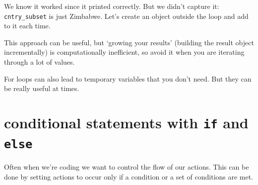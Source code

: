 \documentclass[]{book}
\newenvironment{Shaded}{\begin{snugshade}}{\end{snugshade}}
\newcommand{\KeywordTok}[1]{\textcolor[rgb]{0.13,0.29,0.53}{\textbf{#1}}}
\newcommand{\DataTypeTok}[1]{\textcolor[rgb]{0.13,0.29,0.53}{#1}}
\newcommand{\StringTok}[1]{\textcolor[rgb]{0.31,0.60,0.02}{#1}}
\newcommand{\CommentTok}[1]{\textcolor[rgb]{0.56,0.35,0.01}{\textit{#1}}}
\newcommand{\ControlFlowTok}[1]{\textcolor[rgb]{0.13,0.29,0.53}{\textbf{#1}}}
\newcommand{\OperatorTok}[1]{\textcolor[rgb]{0.81,0.36,0.00}{\textbf{#1}}}
\newcommand{\NormalTok}[1]{#1}
\theoremstyle{definition}
\theoremstyle{definition}
\theoremstyle{definition}
\theoremstyle{remark}
\begin{document}
We know it worked since it printed correctly. But we didn't capture it:
\texttt{cntry\_subset} is just Zimbabwe. Let's create an object outside
the loop and add to it each time.

\begin{Shaded}
\end{Shaded}

This approach can be useful, but `growing your results' (building the
result object incrementally) is computationally inefficient, so avoid it
when you are iterating through a lot of values.

For loops can also lead to temporary variables that you don't need. But
they can be really useful at times.

\section{\texorpdfstring{conditional statements with \texttt{if} and
\texttt{else}}{conditional statements with if and else}}\label{conditional-statements-with-if-and-else}

Often when we're coding we want to control the flow of our actions. This
can be done by setting actions to occur only if a condition or a set of
conditions are met.
\end{document}
